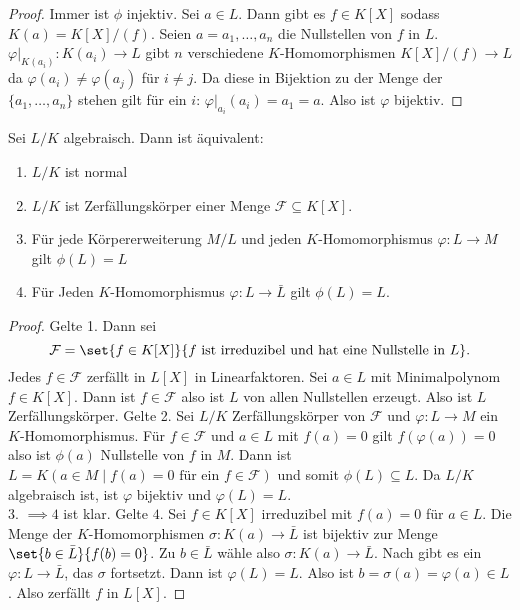 \begin{proof}
    Immer ist \(\phi\) injektiv.
    Sei \(a\in L\). Dann gibt es \(f\in K[X]\) sodass \(K(a)=K[X]/(f)\). Seien \(a=a_1,\dots,a_n\) die Nullstellen von \(f\) in \(L\).
    \(\varphi|_{K(a_i)}\colon K(a_i)\to L\) gibt \(n\) verschiedene \(K\)-Homomorphismen \(K[X]/(f)\to L\) da \(\varphi(a_i)\neq \varphi(a_j)\) für \(i\neq j\). Da diese in Bijektion zu der Menge der \(\{a_1,\dots,a_n\}\) stehen gilt für ein \(i\): \(\varphi|_{a_i}(a_i)=a_1=a\). Also ist \(\varphi\) bijektiv.
\end{proof}
\begin{Satz}
    Sei \(L/K\) algebraisch. Dann ist äquivalent:
    \begin{enumerate}
        \item \(L/K\) ist normal
        \item \(L/K\) ist Zerfällungskörper einer Menge \(\mathcal F\subseteq K[X]\).
        \item Für jede Körpererweiterung \(M/L\) und jeden \(K\)-Homomorphismus \(\varphi\colon L\to M\) gilt \(\phi(L)=L\)
        \item Für Jeden \(K\)-Homomorphismus \(\varphi\colon L\to\bar L\) gilt \(\phi(L)=L\).
    \end{enumerate}
\end{Satz}
\begin{proof}
    Gelte 1. Dann sei \[\mathcal F=\set{f\in K[X]}{ f\text{ ist irreduzibel und hat eine Nullstelle in \(L\)}}.\]
    Jedes \(f\in \mathcal F\) zerfällt in \(L[X]\) in Linearfaktoren.
    Sei \(a\in L\) mit Minimalpolynom \(f\in K[X]\). Dann ist \(f\in\mathcal F\) also ist \(L\) von allen Nullstellen erzeugt. Also ist \(L\) Zerfällungskörper.
    Gelte 2. Sei \(L/K\) Zerfällungskörper von \(\mathcal F\) und \(\varphi\colon L\to M\) ein \(K\)-Homomorphismus. Für \(f\in \mathcal F\) und \(a\in L\) mit \(f(a)=0\) gilt \(f(\varphi(a))=0\) also ist \(\phi(a)\) Nullstelle von \(f\) in \(M\).
    Dann ist \(L=K(a\in M\mid f(a)=0 \text{ für ein } f\in\mathcal F)\) und somit \(\phi(L)\subseteq L\). Da \(L/K\) algebraisch ist, ist \(\varphi\) bijektiv und \(\varphi(L)=L.\)\\
    3. \(\implies 4\) ist klar. Gelte \(4.\) Sei \(f\in K[X]\) irreduzibel mit \(f(a)=0\) für \(a\in L\).
    Die Menge der \(K\)-Homomorphismen \(\sigma\colon K(a)\to \bar L\) ist bijektiv zur Menge \(\set{b\in\bar L}{ f(b)=0}\). Zu \(b\in \bar L\) wähle also \(\sigma\colon K(a)\to \bar L\).
    Nach  gibt es ein \(\varphi\colon L\to \bar L\), das \(\sigma\) fortsetzt. Dann ist \(\varphi(L)=L\). Also ist \(b=\sigma(a)=\varphi(a)\in L\). Also zerfällt \(f\) in \(L[X]\).
\end{proof}
